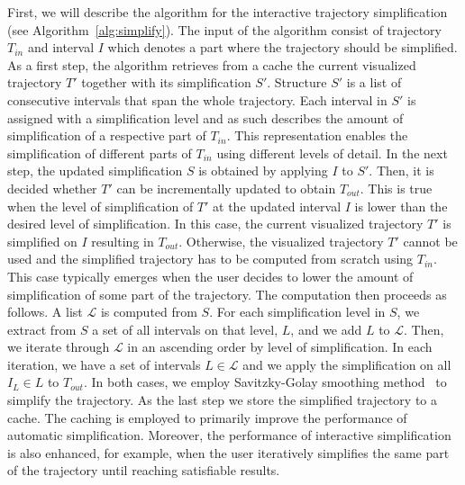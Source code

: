 First, we will describe the algorithm for the interactive trajectory simplification (see Algorithm~\ref{alg:simplify}).
The input of the algorithm consist of trajectory $T_{in}$ and interval $I$ which denotes a part where the trajectory should be simplified.
As a first step, the algorithm retrieves from a cache the current visualized trajectory $T'$ together with its simplification $S'$.
Structure $S'$ is a list of consecutive intervals that span the whole trajectory.
Each interval in $S'$ is assigned with a simplification level and as such describes the amount of simplification of a respective part of $T_{in}$.
This representation enables the simplification of different parts of $T_{in}$ using different levels of detail.
In the next step, the updated simplification $S$ is obtained by applying $I$ to $S'$.
Then, it is decided whether $T'$ can be incrementally updated to obtain $T_{out}$.
This is true when the level of simplification of $T'$ at the updated interval $I$ is lower than the desired level of simplification.
In this case, the current visualized trajectory $T'$ is simplified on $I$ resulting in $T_{out}$.
Otherwise, the visualized trajectory $T'$ cannot be used and the simplified trajectory has to be computed from scratch using $T_{in}$.
This case typically emerges when the user decides to lower the amount of simplification of some part of the trajectory.
The computation then proceeds as follows.
A list $\mathcal{L}$ is computed from $S$.
For each simplification level in $S$, we extract from $S$ a set of all intervals on that level, $L$, and we add $L$ to $\mathcal{L}$.
Then, we iterate through $\mathcal{L}$ in an ascending order by level of simplification.
In each iteration, we have a set of intervals $L \in \mathcal{L}$ and we apply the simplification on all $I_L \in L$ to $T_{out}$.
In both cases, we employ Savitzky-Golay smoothing method~\cite{savitzky1964smoothing} to simplify the trajectory.
As the last step we store the simplified trajectory to a cache.
The caching is employed to primarily improve the performance of automatic simplification.
Moreover, the performance of interactive simplification is also enhanced, for example, when the user iteratively simplifies the same part of the trajectory until reaching satisfiable results.

